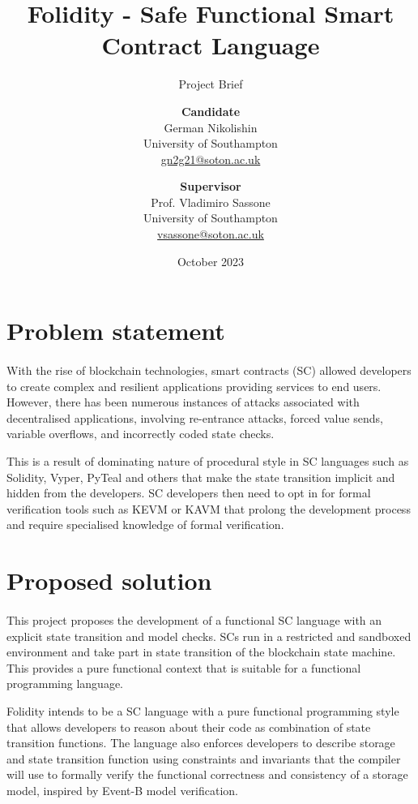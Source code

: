 \documentclass[10pt, a4paper]{article}
\title{Folidity - Safe Functional Smart Contract Language}
\subtitle{Project Brief}
\author{
  \textbf{Candidate}\\
  German Nikolishin\\
  University of Southampton\\
  \href{mailto:gn2g21@soton.ac.uk}{gn2g21@soton.ac.uk}
  \and
  \textbf{Supervisor}\\
  Prof. Vladimiro Sassone\\
  University of Southampton\\
  \href{mailto:vsassone@soton.ac.uk}{vsassone@soton.ac.uk}
}
\date{October 2023}
\begin{document}
\maketitle
\thispagestyle{empty}



\section*{Problem statement}
\paragraph{}
With the rise of blockchain technologies, smart contracts (SC) allowed developers to create complex and resilient applications providing services to end users. However, there has been numerous instances of attacks associated with decentralised applications, involving re-entrance attacks, forced value sends, variable overflows, and incorrectly coded state checks.

This is a result of dominating nature of procedural style in SC languages such as Solidity, Vyper, PyTeal and others that make the state transition implicit and hidden from the developers. SC developers then need to opt in for formal verification tools such as KEVM or KAVM that prolong the development process and require specialised knowledge of formal verification.

\section*{Proposed solution}
\paragraph{}
This project proposes the development of a functional SC language with an explicit state transition and model checks. SCs run in a restricted and sandboxed environment and take part in state transition of the blockchain state machine. This provides a pure functional context that is suitable for a functional programming language. 

Folidity intends to be a SC language with a pure functional programming style that allows developers to reason about their code as combination of state transition functions. The language also enforces developers to describe storage and state transition function using constraints and invariants that the compiler will use to formally verify the functional correctness and consistency of a storage model, inspired by Event-B model verification.
\end{document}
